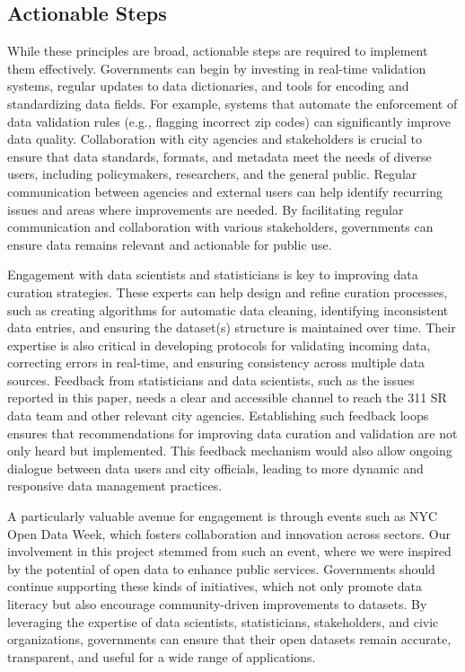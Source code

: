 \documentclass[linenumber]{jdsart}
\begin{document}
\subsection{Actionable Steps}
While these principles are broad, actionable steps are required to 
implement them effectively. Governments can begin by investing in 
real-time validation systems, regular updates to data dictionaries, 
and tools for encoding and standardizing data fields. For example, 
systems that automate the enforcement of data validation rules 
(e.g., flagging incorrect zip codes) can significantly improve data 
quality. Collaboration with city agencies and stakeholders is crucial 
to ensure that data standards, formats, and metadata meet the needs 
of diverse users, including policymakers, researchers, and the 
general public. Regular communication between agencies and external 
users can help identify recurring issues and areas where improvements 
are needed. By facilitating regular communication and collaboration 
with various stakeholders, governments can ensure data remains relevant 
and actionable for public use.


Engagement with data scientists and statisticians is key to improving 
data curation strategies. These experts can help design and refine 
curation processes, such as creating algorithms for automatic data 
cleaning, identifying inconsistent data entries, and ensuring the 
dataset(s) structure is maintained over time. Their expertise is also 
critical in developing protocols for validating incoming data, correcting 
errors in real-time, and ensuring consistency across multiple data sources. 
Feedback from statisticians and data scientists, such as the issues reported 
in this paper, needs a clear and accessible channel to reach the 311 SR data 
team and other relevant city agencies. Establishing such feedback loops 
ensures that recommendations for improving data curation and validation 
are not only heard but implemented. This feedback mechanism would also allow 
ongoing dialogue between data users and city officials, leading to more dynamic 
and responsive data management practices.


A particularly valuable avenue for engagement is through events such as NYC 
Open Data Week, which fosters collaboration and innovation across sectors. 
Our involvement in this project stemmed from such an event, where we were 
inspired by the potential of open data to enhance public services. Governments 
should continue supporting these kinds of initiatives, which not only promote 
data literacy but also encourage community-driven improvements to datasets. 
By leveraging the expertise of data scientists, statisticians, stakeholders, 
and civic organizations, governments can ensure that their open datasets 
remain accurate, transparent, and useful for a wide range of applications.
\end{document}
